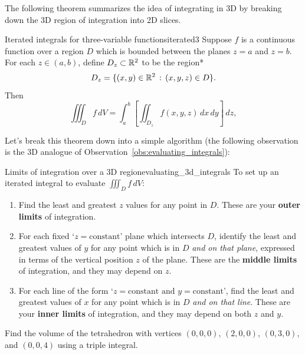 \documentclass[svgnames]{watsonbook}
\begin{document}
The following theorem summarizes the idea of integrating in 3D by
breaking down the 3D region of integration into 2D slices. 

\begin{theo}{Iterated integrals for three-variable functions}{iterated3}
  Suppose $f$ is a continuous function over a region $D$ which is
  bounded between the planes $z = a$ and $z = b$. For each
  $z \in (a,b)$, define $D_z \subset \mathbb{R}^2$ to be the region*
  \[
    D_z = \{(x,y) \in \mathbb{R}^2 \, : \, (x,y,z) \in D\}. 
  \]
  Then
  \[
    \iiint _D f \, dV =
    \int_a^b \left[\iint_{D_z} f(x,y,z) \, dx \, dy \right] \, dz, 
  \]
\end{theo}

Let's break this theorem down into a simple algorithm 
(the following observation is the 3D analogue of
Observation~\ref{obs:evaluating_integrals}): 

\begin{obs}{Limits of integration over a 3D
    region}{evaluating_3d_integrals}
  To set up an iterated integral to evaluate $\iiint_D f \, dV$: 
  \begin{enumerate}[itemsep=3pt, topsep = 8pt]
\item Find the least and greatest $z$ values for any point in
  $D$. These are your \textbf{outer limits} of integration. 
\item For each fixed `$z=\text{constant}$' plane which intersects $D$, identify
  the least and greatest values of $y$ for any point which is in $D$
  \textit{and on that plane}, expressed in terms of the vertical
  position $z$ of the plane. These are the \textbf{middle limits} of
  integration, and they may depend on $z$.
\item For each line of the form `$z=\text{constant and
  }y=\text{constant}$', find the least and greatest values of $x$ for
  any point which is in $D$ \textit{and on that line}. These are your
  \textbf{inner limits} of integration, and they may depend on both
  $z$ and $y$. 
\end{enumerate}
\end{obs}

\begin{example}{}{}
  Find the volume of the tetrahedron with vertices $(0,0,0)$,
  $(2,0,0)$, $(0,3,0)$, and $(0,0,4)$ using a triple integral. 
\end{example}
\end{document}
